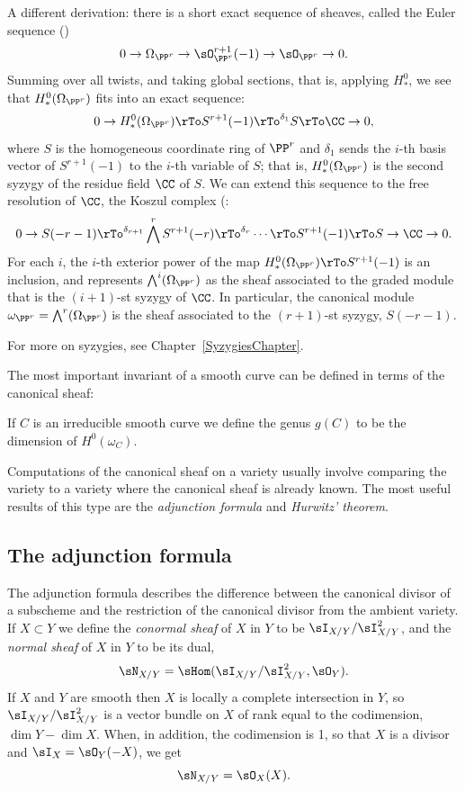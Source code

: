 \begin{fact}
A different derivation: there is a short exact sequence of sheaves, called the Euler sequence (\cite[Ch. II.8]{Hartshorne1977})
$$
0\to \Omega_{\PP^{r}} \to \sO_{\PP^{r}}^{r+1} (-1) \to \sO_{\PP^{r}} \to 0.
$$
Summing over all twists, and taking global sections, that is, applying $H^0_*$, we see that 
$H^0_*(\Omega_{\PP^{r}})$ fits into an exact sequence:
$$
0 \to H^0_*(\Omega_{\PP^{r}}) \rTo S^{r+1}(-1) \rTo^{\delta_{1}} S \rTo \CC \to 0,
$$
where $S$ is the homogeneous coordinate ring of $\PP^r$ and $\delta_1$ sends the $i$-th basis vector of
$S^{r+1}(-1)$ to the $i$-th variable of $S$; that is, $H^0_*(\Omega_{\PP^{r}})$ is the second syzygy of the residue field $\CC$ of $S$. We can extend this sequence to  the free resolution
of $\CC$, the Koszul complex (\cite[Ch. 17.5]{Eisenbud1995}:
$$
0 \to S(-r-1) \rTo^{\delta_{r+1}} \bigwedge^rS^{r+1}(-r) \rTo^{\delta_{r}} \cdots \rTo S^{r+1}(-1) \rTo S \to \CC \to 0.
$$
For each $i$, the $i$-th exterior power of the map $H^0_*(\Omega_{\PP^{r}}) \rTo S^{r+1}(-1)$ is an inclusion, and
represents $\bigwedge^i(\Omega_{\PP^{r}})$ as the sheaf associated to the graded module that is the $(i+1)$-st syzygy of $\CC$.
In particular, the canonical module $\omega_{\PP^r} = \bigwedge^r(\Omega_{\PP^{r}})$ is the sheaf associated to the 
$(r+1)$-st syzygy, $S(-r-1)$.

For more on syzygies, see Chapter~\ref{SyzygiesChapter}.
\end{fact}

The most important invariant of a smooth curve can be defined in terms of the canonical sheaf:

\begin{definition}
If $C$ is an irreducible smooth curve we define the genus $g(C)$ to be the dimension of $H^0(\omega_C)$.
\end{definition}

Computations of the canonical sheaf on a variety usually involve comparing the variety to a variety where the canonical sheaf is already known. The most useful results of this type are  the \emph{adjunction formula}
and \emph{Hurwitz' theorem}. 

\subsection{The adjunction formula}\label{Adjunction Formula}

The adjunction formula describes the difference between the canonical divisor of
a  subscheme and the restriction of the canonical divisor from the ambient variety.
If $X\subset Y$ we define the \emph{conormal sheaf} of $X$ in $Y$ to be $\sI_{X/Y}/\sI_{X/Y}^{2}$,
and the \emph{normal sheaf} of $X$ in $Y$ to be its dual, 
$$
\sN_{X/Y} = \sHom(\sI_{X/Y}/\sI_{X/Y}^{2}, \sO_{Y}).
$$
If $X$ and $Y$ are smooth then $X$ is locally a complete intersection in $Y$, so
 $\sI_{X/Y}/\sI_{X/Y}^{2}$ is a vector bundle on $X$ of rank equal to the codimension, $\dim Y -\dim X$.
 When, in addition, the codimension is 1, so that $X$ is a divisor and $\sI_{X} = \sO_{Y}(-X)$, we get
 $$
 \sN_{X/Y} = \sO_{X}(X).
 $$


